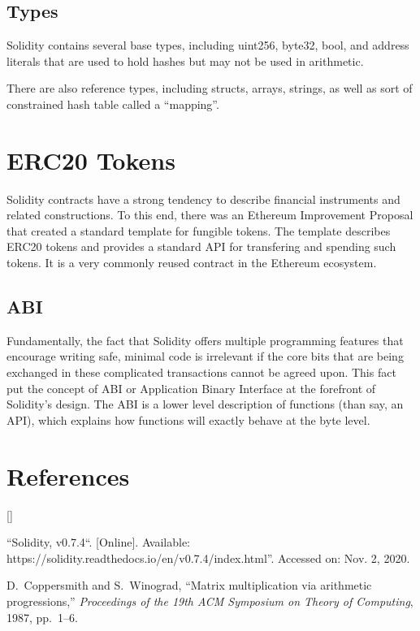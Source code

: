 \documentclass[twoside]{article}
\def\beginrefs{\begin{list}%
        {[\arabic{equation}]}{\usecounter{equation}
         \setlength{\leftmargin}{2.0truecm}\setlength{\labelsep}{0.4truecm}%
         \setlength{\labelwidth}{1.6truecm}}}
\def\endrefs{\end{list}}
\def\bibentry#1{\item[\hbox{[#1]}]}
\begin{document}
\subsection{Types}

Solidity contains several base types, including uint256, byte32, bool, and
address literals that are used to hold hashes but may not be used in arithmetic.

There are also reference types, including structs, arrays, strings, as well as
sort of constrained hash table called a ``mapping''.  

\section{ERC20 Tokens}

Solidity contracts have a strong tendency to describe financial instruments and
related constructions.  To this end, there was an Ethereum Improvement Proposal
that created a standard template for fungible tokens.  The template describes
ERC20 tokens and provides a standard API for transfering and spending such
tokens.  It is a very commonly reused contract in the Ethereum ecosystem.

\subsection{ABI}

Fundamentally, the fact that Solidity offers multiple programming features that
encourage writing safe, minimal code is irrelevant if the core bits that are
being exchanged in these complicated transactions cannot be agreed upon.  This
fact put the concept of ABI or Application Binary Interface at the forefront of
Solidity's design.  The ABI is a lower level description of functions (than say,
an API), which explains how functions will exactly behave at the byte level.  

\section*{References}
\beginrefs

\bibentry{Sol} ``Solidity, v0.7.4``. [Online]. Available: https://solidity.readthedocs.io/en/v0.7.4/index.html''.  Accessed on: Nov. 2, 2020.

\bibentry{CW87}{\sc D.~Coppersmith} and {\sc S.~Winograd}, 
``Matrix multiplication via arithmetic progressions,''
{\it Proceedings of the 19th ACM Symposium on Theory of Computing},
1987, pp.~1--6.

\endrefs

\end{document}
